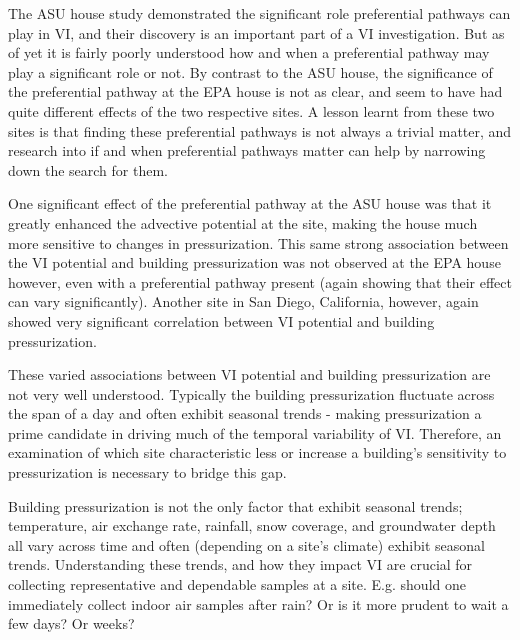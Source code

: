 \documentclass[../thesis.tex]{subfiles}
\begin{document}
The ASU house study demonstrated the significant role preferential pathways can play in VI, and their discovery is an important part of a VI investigation.
But as of yet it is fairly poorly understood how and when a preferential pathway may play a significant role or not.
By contrast to the ASU house, the significance of the preferential pathway at the EPA house is not as clear, and seem to have had quite different effects of the two respective sites.
A lesson learnt from these two sites is that finding these preferential pathways is not always a trivial matter, and research into if and when preferential pathways matter can help by narrowing down the search for them.\par

One significant effect of the preferential pathway at the ASU house was that it greatly enhanced the advective potential at the site, making the house much more sensitive to changes in pressurization\cite{strom_factors_2019,guo_identification_2015,holton_temporal_2013}.
This same strong association between the VI potential and building pressurization was not observed at the EPA house however, even with a preferential pathway present (again showing that their effect can vary significantly).
Another site in San Diego, California, however, again showed very significant correlation between VI potential and building pressurization\cite{hosangadi_high-frequency_2017}.\par

These varied associations between VI potential and building pressurization are not very well understood.
Typically the building pressurization fluctuate across the span of a day and often exhibit seasonal trends - making pressurization a prime candidate in driving much of the temporal variability of VI.
Therefore, an examination of which site characteristic less or increase a building's sensitivity to pressurization is necessary to bridge this gap.\par

Building pressurization is not the only factor that exhibit seasonal trends; temperature, air exchange rate, rainfall, snow coverage, and groundwater depth all vary across time and often (depending on a site's climate) exhibit seasonal trends.
Understanding these trends, and how they impact VI are crucial for collecting representative and dependable samples at a site.
E.g. should one immediately collect indoor air samples after rain? Or is it more prudent to wait a few days? Or weeks? \par
\end{document}
